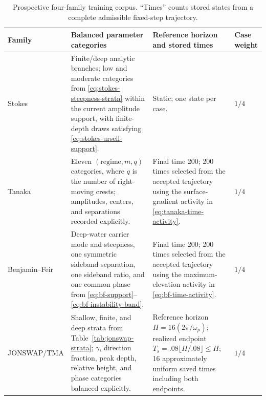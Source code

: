 \documentclass[11pt]{article}
\begin{document}
\begin{table}[ht]
  \centering
  \caption{Prospective four-family training corpus.  ``Times'' counts stored states
  from a complete admissible fixed-step trajectory.}
  \label{tab:proposed-corpus}
  \small
  \begin{tabularx}{\textwidth}{
    @{}>{\raggedright\arraybackslash}p{}
       >{\raggedright\arraybackslash}X
       >{\raggedright\arraybackslash}p{}
       >{\raggedright\arraybackslash}p{}@{}}
    \toprule
    Family & Balanced parameter categories & Reference horizon and stored times
        & Case weight \\
    \midrule
    Stokes
      & Finite/deep analytic branches; low and moderate categories from
        \eqref{eq:stokes-steepness-strata} within the current amplitude
        support, with finite-depth draws satisfying
        \eqref{eq:stokes-ursell-support}.
      & Static; one state per case.
      & $1/4$ \\
    Tanaka
      & Eleven $(\mathrm{regime},m,q)$ categories, where $q$ is the number of
        right-moving crests; amplitudes, centers, and separations recorded
        explicitly.
      & Final time 200; 200 times selected from the accepted trajectory using
        the surface-gradient activity in \eqref{eq:tanaka-time-activity}.
      & $1/4$ \\
    Benjamin--Feir
      & Deep-water carrier mode and steepness, one symmetric sideband
        separation, one sideband ratio, and one common phase from
        \eqref{eq:bf-support}--\eqref{eq:bf-instability-band}.
      & Final time 200; 200 times selected from the accepted trajectory using
        the maximum-elevation activity in \eqref{eq:bf-time-activity}.
      & $1/4$ \\
    JONSWAP/TMA
      & Shallow, finite, and deep strata from
        Table~\ref{tab:jonswap-strata}; $\gamma$, direction fraction, peak
        depth, relative height, and phase categories balanced explicitly.
      & Reference horizon $H=16(2\pi/\omega_p)$; realized endpoint
        $T_s=.08\lfloor H/.08\rfloor\leq H$; 16 approximately uniform saved
        times including both endpoints.
      & $1/4$ \\
    \bottomrule
  \end{tabularx}
\end{table}
\end{document}
